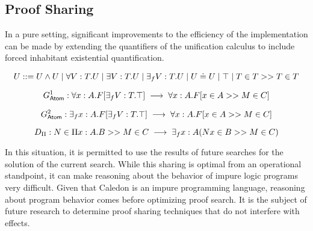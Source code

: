 \subsection{Proof Sharing}

In a pure setting, significant improvements to the efficiency of the implementation
can be made by 
extending the quantifiers of the unification calculus to include forced inhabitant existential quantification.

\[
U ::= U \wedge U 
 \; | \; \forall V : T . U
 \; | \; \exists V : T . U 
 \; | \; \exists_f V : T . U 
 \; | \; U \doteq U
 \; | \; \top
 \; | \; T \in T >> T \in T
\]

\[
G^1_{\mathsf{Atom}} : \forall x : A . F[\exists_f V : T . \top]  \;\longrightarrow\; \forall x : A . F[x \in A >> M \in C]
\]

\[
G^2_{\mathsf{Atom}} : \exists_f x : A . F[\exists_f V : T . \top]  \;\longrightarrow\; \forall x : A . F[x \in A >> M \in C]
\]

\[
D_\Pi : N\in \Pi x : A . B >> M \in C \;\longrightarrow\; \exists_f x : A ( N x \in B >> M \in C)
\]

In this situation, it is permitted to use the results of future searches for the solution of the current search.
While this sharing is optimal from an operational standpoint, it can make reasoning about the behavior 
of impure logic programs very difficult.  Given that Caledon is an impure programming language, reasoning about program
behavior comes before optimizing proof search.  It is the subject of future research to determine proof sharing techniques
that do not interfere with effects. 
